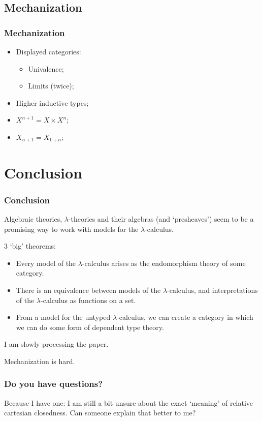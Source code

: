\documentclass[aspectratio=169]{fancyslides} %
\begin{document}
  \subsection{Mechanization}
  \begin{frame}
    \frametitle{Mechanization}

    \begin{itemize}
      \item Displayed categories:
      \begin{itemize}
        \item Univalence;
        \item Limits (twice);
      \end{itemize}
      \item Higher inductive types;
      \item $ X^{n + 1} = X \times X^n $;
      \item $ X_{n + 1} = X_{1 + n} $;
    \end{itemize}

  \end{frame}

  \section{Conclusion}

  \frame{\tableofcontents[currentsection]}

  \begin{frame}
    \frametitle{Conclusion}

    Algebraic theories, $ \lambda $-theories and their algebras (and `presheaves') seem to be a promising way to work with models for the $ \lambda $-calculus.

    \pause

    3 `big' theorems:
    \begin{itemize}
      \item Every model of the $ \lambda $-calculus arises as the endomorphism theory of some category.
      \item There is an equivalence between models of the $ \lambda $-calculus, and interpretations of the $ \lambda $-calculus as functions on a set.
      \item From a model for the untyped $ \lambda $-calculus, we can create a category in which we can do some form of dependent type theory.
    \end{itemize}

    \pause

    I am slowly processing the paper.

    \pause

    Mechanization is hard.

  \end{frame}

  \begin{frame}
    \frametitle{Do you have questions?}

    \pause

    Because I have one: I am still a bit unsure about the exact `meaning' of relative cartesian closedness. Can someone explain that better to me?

  \end{frame}
\end{document}
